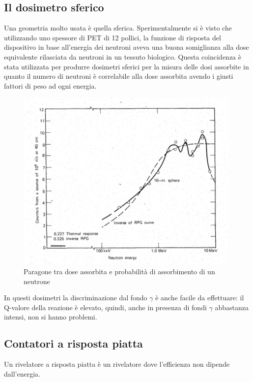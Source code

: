 \subsection{Il dosimetro sferico}
Una geometria molto usata \`e quella sferica.
Sperimentalmente si \`e visto che utilizzando uno spessore di PET di 12 pollici, la funzione di risposta del dispositivo in base all'energia dei neutroni aveva una buona somiglianza
alla dose equivalente rilasciata da neutroni in un tessuto biologico.
Questa coincidenza \`e stata utilizzata per produrre dosimetri sferici per la misura delle dosi assorbite in quanto il numero di neutroni \`e correlabile
alla dose assorbita avendo i giusti fattori di peso ad ogni energia.
\begin{figure}[htbp]
\begin{center}
\includegraphics[scale=1]{./Immagini/DoseNeutroni.png}
\caption{Paragone tra dose assorbita e probabilit\`a di assorbimento di un neutrone}
\label{fig:doseNeutroni}
\end{center}
\end{figure}
In questi dosimetri la discriminazione dal fondo $\gamma$ \`e anche facile da effettuare: il Q-valore della reazione \`e elevato, quindi, anche in presenza
di fondi $\gamma$ abbastanza intensi, non si hanno problemi.
\subsection{Contatori a risposta piatta}
Un rivelatore a risposta piatta \`e un rivelatore dove l'efficienza non dipende dall'energia.
